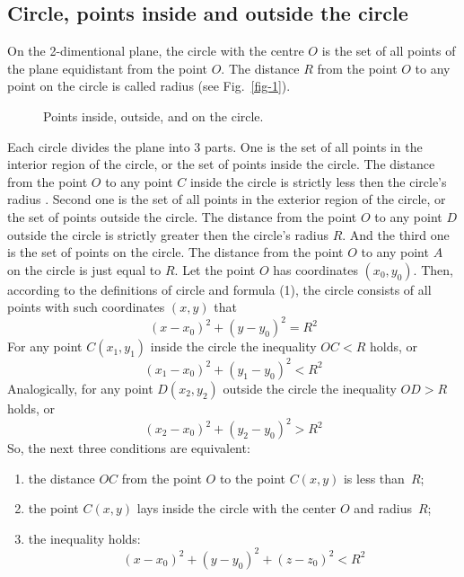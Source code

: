 \documentclass{article}
\begin{document}
\subsection{Circle, points inside and outside the circle} %

On the 2-dimentional plane, the circle with the centre $O$ is the set of all points of the plane equidistant from the point $O$.
The distance $R$ from the point $O$ to any point on the circle is called radius (see Fig.~\ref{fig-1}).
\begin{figure}
  \centering
  \def\svgwidth{\columnwidth}
  
\caption{Points inside, outside, and on the circle.}
\label{fig-4}
\end{figure}
%
Each circle divides the plane into 3 parts.
One is the set of all points in the interior region of the circle, or the set of points inside the circle.
The distance from the point $O$ to any point $C$ inside the circle is strictly less then the circle’s radius     .
Second one is the set of all points in the exterior region of the circle, or the set of points outside the circle.
The distance from the point $O$ to any point $D$ outside the circle is strictly greater then the circle’s radius $R$.
And the third one is the set of points on the circle.
The distance from the point $O$ to any point $A$ on the circle is just equal to $R$.
Let the point $O$ has coordinates $(x_0, y_0)$.
Then, according to the definitions of circle and formula (1), the circle consists of all points with such coordinates $(x, y)$ that
\begin{equation}
  (x - x_0)^2 + (y - y_0)^2 = R^2
\end{equation}
For any point $C(x_1, y_1)$ inside the circle the inequality $OC < R$ holds, or
\begin{equation}
  (x_1 - x_0)^2 + (y_1 - y_0)^2 < R^2
\end{equation}
Analogically, for any point $D(x_2, y_2)$ outside the circle the inequality $OD > R$ holds, or
\begin{equation}
  (x_2 - x_0)^2 + (y_2 - y_0)^2 > R^2
\end{equation}
So, the next three conditions are equivalent:
\begin{enumerate}
\item
the distance $OC$ from the point $O$ to the point $C(x, y)$ is less than~$R$;
\item
the point $C(x, y)$ lays inside the circle with the center $O$ and radius~$R$;
\item
the inequality holds:
\begin{equation}
  (x - x_0)^2 + (y - y_0)^2 + (z - z_0)^2 < R^2
\end{equation}
\end{enumerate}
\end{document}
